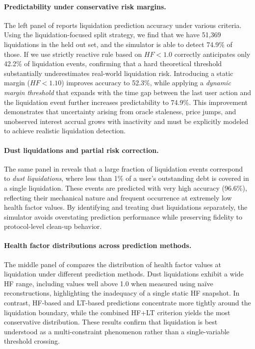 \documentclass[manuscript,screen,review]{acmart}
\begin{document}
\paragraph{Predictability under conservative risk margins.}
The left panel of  reports liquidation prediction accuracy under various criteria. Using the liquidation-focused split strategy, we find that we have 51,369 liquidations in the held out set, and the simulator is able to detect 74.9\% of those. If we use strictly reactive rule based on $HF < 1.0$ correctly anticipates only 42.2\% of liquidation events, confirming that a hard theoretical threshold substantially underestimates real-world liquidation risk. Introducing a static margin ($HF < 1.10$) improves accuracy to 52.3\%, while applying a \emph{dynamic margin threshold} that expands with the time gap between the last user action and the liquidation event further increases predictability to 74.9\%. This improvement demonstrates that uncertainty arising from oracle staleness, price jumps, and unobserved interest accrual grows with inactivity and must be explicitly modeled to achieve realistic liquidation detection.

\paragraph{Dust liquidations and partial risk correction.}
The same panel in  reveals that a large fraction of liquidation events correspond to \emph{dust liquidations}, where less than 1\% of a user’s outstanding debt is covered in a single liquidation. These events are predicted with very high accuracy (96.6\%), reflecting their mechanical nature and frequent occurrence at extremely low health factor values. By identifying and treating dust liquidations separately, the simulator avoids overstating prediction performance while preserving fidelity to protocol-level clean-up behavior.

\paragraph{Health factor distributions across prediction methods.}
The middle panel of  compares the distribution of health factor values at liquidation under different prediction methods. Dust liquidations exhibit a wide HF range, including values well above 1.0 when measured using naïve reconstructions, highlighting the inadequacy of a single static HF snapshot. In contrast, HF-based and LT-based predictions concentrate more tightly around the liquidation boundary, while the combined HF+LT criterion yields the most conservative distribution. These results confirm that liquidation is best understood as a multi-constraint phenomenon rather than a single-variable threshold crossing.
\end{document}

